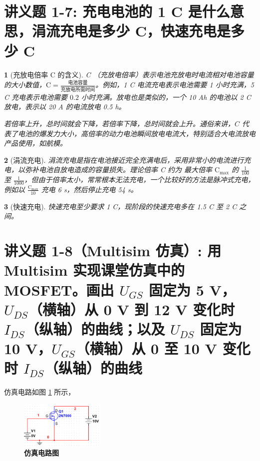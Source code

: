 \documentclass[UTF8]{report}
\theoremstyle{MyLineTheoremStyle} %
\theoremstyle{MyBlockTheoremStyle} %
\theoremstyle{MySubsubsectionStyle} %
\newtheorem{definition}{}
\begin{document}
\section{讲义题 1-7: 充电电池的 1 C 是什么意思，涓流充电是多少 C，快速充电是多少 C}


\begin{definition}[充放电倍率 C 的含义]
C （充放电倍率）表示电池充放电时电流相对电池容量的大小数值，$\mathrm{C} = \frac{\text{电池容量}}{\text{充放电所需时间}}$。例如，1 C 电流充电表示电池需要 1 小时充满，5 C 充电表示电池需要 $0.2$ 小时充满。放电也是类似的，一个 10 Ah 的电池以 2 C 放电，表示以 20 A 的电流放电 0.5 h。 \par
若倍率上升，总时间就会下降，若倍率下降，总时间就会上升。通俗来讲，$C$ 代表了电池的爆发力大小，高倍率的动力电池瞬间放电电流大，特别适合大电流放电产品使用，如航模。
\end{definition}


\begin{definition}[涓流充电]
涓流充电是指在电池接近完全充满电后，采用非常小的电流进行充电，以弥补电池自放电造成的容量损失。理论倍率 C 约为 最大倍率 $\mathrm{C_{max}}$ 的 $\frac{1}{100}$ 至 $\frac{1}{1000}$，但由于倍率太小，常常根本无法充电，一个比较好的方法是脉冲式充电，例如以 $\frac{\mathrm{C_{max}}}{10}$ 充电 6 s，然后停止充电 54 s。
\end{definition}


\begin{definition}[快速充电]
快速充电至少要求 1 C，现阶段的快速充电多在 1.5 C 至 2 C 之间。
\end{definition}


\section{讲义题 1-8（Multisim 仿真）: 用 Multisim 实现课堂仿真中的 MOSFET。画出 $U_{GS}$ 固定为 5 V，$U_{DS}$（横轴）从 0 V 到 12 V 变化时 $I_{DS}$（纵轴）的曲线；以及 $U_{DS}$ 固定为 10 V，$U_{GS}$（横轴）从 0 至 10 V 变化时 $I_{DS}$（纵轴）的曲线}

仿真电路如图 \ref{仿真电路图} 所示，

\begin{figure}[H]\centering
\includegraphics[width=0.36\textwidth]{assets/1/5c45ed5b5258df3fa8e1babac4a7ace2.png}
\caption{\textbf{仿真电路图}}\label{仿真电路图}
\end{figure}
\end{document}
